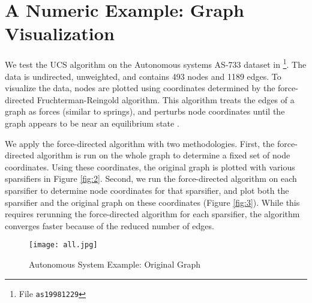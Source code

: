 \documentclass[final,leqno,onefignum,onetabnum]{siamltex1213}
\begin{document}
\section{A Numeric Example: Graph Visualization}
We test the UCS algorithm on the Autonomous systems \mbox{AS-733} dataset in \cite{snapnets}\footnote{File {\tt as19981229}}.  The data is undirected, unweighted, and contains 493 nodes and 1189 edges.  To visualize the data, nodes are plotted using coordinates determined by the force-directed Fruchterman-Reingold algorithm.  This algorithm treats the edges of a graph as forces (similar to springs), and perturbs node coordinates until the graph appears to be near an equilibrium state \cite{FruRei91}.

We apply the force-directed algorithm with two methodologies.  First, the force-directed algorithm is run on the whole graph to determine a fixed set of node coordinates.  Using these coordinates, the original graph is plotted with various sparsifiers in Figure \ref{fig:2}.  Second, we run the force-directed algorithm on each sparsifier to determine node coordinates for that sparsifier, and plot both the sparsifier and the original graph on these coordinates (Figure \ref{fig:3}).  While this requires rerunning the force-directed algorithm for each sparsifier, the algorithm converges faster because of the reduced number of edges.

\begin{figure}[t]
\centering
    \texttt{[image: all.jpg]}
\caption[]{Autonomous System Example: Original Graph}
\label{fig:1}
\vspace{-0.5cm}
\end{figure}
\end{document}
